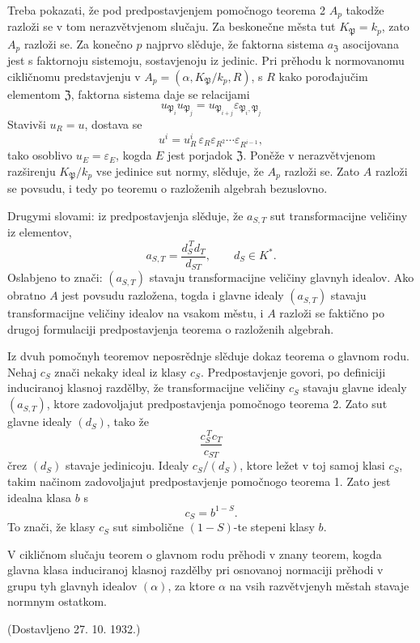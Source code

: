 \documentclass[11pt]{article}
\providecommand{\PP}{\mathfrak P}
\begin{document}
Treba pokazati, že pod predpostavjenjem pomočnogo teorema 2 \(A_p\) takodže razloži se v tom nerazvětvjenom slučaju. Za beskonečne města tut \(K_\PP=k_p\), zato \(A_p\) razloži se. Za konečno \(p\) najprvo slěduje, že faktorna sistema \(a_{\mathfrak Z}\) asocijovana jest s faktornoju sistemoju, sostavjenoju iz jedinic. Pri prěhodu k normovanomu cikličnomu predstavjenju v \(A_p=(\alpha,K_\PP/k_p,R)\), s \(R\) kako porođajučim elementom \(\mathfrak Z\), faktorna sistema daje se relacijami
\[
        u_{\PP_i}u_{\PP_j}=u_{\PP_{i+j}}\varepsilon_{\PP_i,\PP_j}
\]
Stavivši \(u_R=u\), dostava se
\[
        u^i=u_R^i\,\varepsilon_R\varepsilon_{R^2}\cdots \varepsilon_{R^{i-1}},
\]
tako osoblivo \(u_E=\varepsilon_E\), kogda \(E\) jest porjadok \(\mathfrak Z\). Poněže v nerazvětvjenom razširenju \(K_\PP/k_p\) vse jedinice sut normy, slěduje, že \(A_p\) razloži se. Zato \(A\) razloži se povsudu, i tedy po teoremu o razloženih algebrah bezuslovno.

Drugymi slovami: iz predpostavjenja slěduje, že \(a_{S,T}\) sut transformacijne veličiny iz elementov,
\[
        a_{S,T}=\frac{d_S^{\,T}d_T}{d_{ST}},
        \qquad d_S\in K^*.
\]
Oslabjeno to znači: \((a_{S,T})\) stavaju transformacijne veličiny glavnyh idealov. Ako obratno \(A\) jest povsudu razložena, togda i glavne idealy \((a_{S,T})\) stavaju transformacijne veličiny idealov na vsakom městu, i \(A\) razloži se faktično po drugoj formulaciji predpostavjenja teorema o razloženih algebrah.

Iz dvuh pomočnyh teoremov neposrědnje slěduje dokaz teorema o glavnom rodu. Nehaj \(c_S\) znači nekaky ideal iz klasy \(c_S\). Predpostavjenje govori, po definiciji induciranoj klasnoj razdělby, že transformacijne veličiny \(c_S\) stavaju glavne idealy \((a_{S,T})\), ktore zadovoljajut predpostavjenja pomočnogo teorema 2. Zato sut glavne idealy \((d_S)\), tako že
\[
        \frac{c_S^{\,T}c_T}{c_{ST}}
\]
črez \((d_S)\) stavaje jedinicoju. Idealy \(c_S/(d_S)\), ktore ležet v toj samoj klasi \(c_S\), takim načinom zadovoljajut predpostavjenje pomočnogo teorema 1. Zato jest idealna klasa \(b\) s
\[
        c_S=b^{1-S}.
\]
To znači, že klasy \(c_S\) sut simbolične \((1-S)\)-te stepeni klasy \(b\).

V cikličnom slučaju teorem o glavnom rodu prěhodi v znany teorem, kogda glavna klasa induciranoj klasnoj razdělby pri osnovanoj normaciji prěhodi v grupu tyh glavnyh idealov \((\alpha)\), za ktore \(\alpha\) na vsih razvětvjenyh městah stavaje normnym ostatkom.

\begin{center}
(Dostavljeno 27. 10. 1932.)
\end{center}
\end{document}
